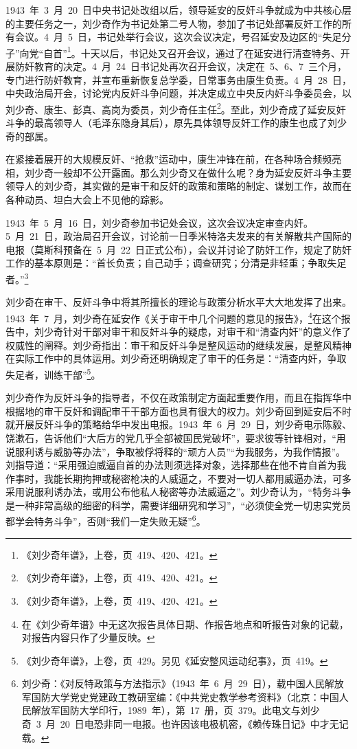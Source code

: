 1943~年~3~月~20~日中央书记处改组以后，领导延安的反奸斗争就成为中共核心层的主要任务之一，刘少奇作为书记处第二号人物，参加了书记处部署反奸工作的所有会议。4~月~5~日，书记处举行会议，这次会议决定，号召延安及边区的“失足分子”向党“自首”\footnote{《刘少奇年谱》，上卷，页~419、420、421。}。十天以后，书记处又召开会议，通过了在延安进行清查特务、开展防奸教育的决定。4~月~24~日书记处再次召开会议，决定在~5、6、7~三个月，专门进行防奸教育，并宣布重新恢复总学委，日常事务由康生负责。4~月~28~日，中央政治局开会，讨论党内反奸斗争问题，并决定成立中央反内奸斗争委员会，以刘少奇、康生、彭真、高岗为委员，刘少奇任主任\footnote{《刘少奇年谱》，上卷，页~419、420、421。}。至此，刘少奇成了延安反奸斗争的最高领导人（毛泽东隐身其后），原先具体领导反奸工作的康生也成了刘少奇的部属。

在紧接着展开的大规模反奸、“抢救”运动中，康生冲锋在前，在各种场合频频亮相，刘少奇一般却不公开露面。那么刘少奇又在做什么呢？身为延安反奸斗争主要领导人的刘少奇，其实做的是审干和反奸的政策和策略的制定、谋划工作，故而在各种动员、坦白大会上不见他的踪影。

1943~年~5~月~16~日，刘少奇参加书记处会议，这次会议决定审查内奸。5~月~21~日，政治局召开会议，讨论前一日季米特洛夫发来的有关解散共产国际的电报（莫斯科预备在~5~月~22~日正式公布），会议并讨论了防奸工作，规定了防奸工作的基本原则是：“首长负责；自己动手；调查研究；分清是非轻重；争取失足者。”\footnote{《刘少奇年谱》，上卷，页~419、420、421。}

刘少奇在审干、反奸斗争中将其所擅长的理论与政策分析水平大大地发挥了出来。1943~年~7~月，刘少奇在延安作《关于审干中几个问题的意见的报告》，\footnote{在《刘少奇年谱》中无这次报告具体日期、作报告地点和听报告对象的记载，对报告内容只作了少量反映。}在这个报告中，刘少奇针对干部对审干和反奸斗争的疑虑，对审干和“清查内奸”的意义作了权威性的阐释。刘少奇指出：审干和反奸斗争是整风运动的继续发展，是整风精神在实际工作中的具体运用。刘少奇还明确规定了审干的任务是：“清查内奸，争取失足者，训练干部”\footnote{《刘少奇年谱》，上卷，页~429。另见《延安整风运动纪事》，页~419。}。

刘少奇作为反奸斗争的指导者，不仅在政策制定方面起重要作用，而且在指挥华中根据地的审干反奸和调配审干干部方面也具有很大的权力。刘少奇回到延安后不时就开展反奸斗争的策略给华中发出电报。1943~年~6~月~29~日，刘少奇电示陈毅、饶漱石，告诉他们“大后方的党几乎全部被国民党破坏”，要求彼等针锋相对，“用说服利诱与威胁等办法”，争取被俘将释的“顽方人员”“为我服务，为我作情报”。刘指导道：“采用强迫威逼自首的办法则须选择对象，选择那些在他不肯自首为我作事时，我能长期拘押或秘密枪决的人威逼之，不要对一切人都用威逼办法，可多采用说服利诱办法，或用公布他私人秘密等办法威逼之”。刘少奇认为，“特务斗争是一种非常高级的细密的科学，需要详细研究和学习”，“必须使全党一切忠实党员都学会特务斗争”，否则“我们一定失败无疑”\footnote{刘少奇：《对反特政策与方法指示》（1943~年~6~月~29~日），载中国人民解放军国防大学党史党建政工教研室编：《中共党史教学参考资料》（北京：中国人民解放军国防大学印行，1989~年），第~17~册，页~379。此电文与刘少奇~3~月~20~日电恐非同一电报。也许因该电极机密，《赖传珠日记》中才无记载。}。

